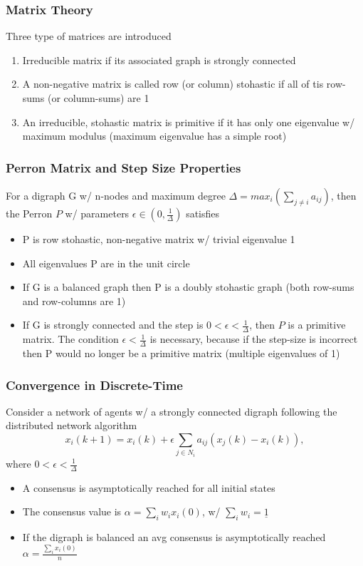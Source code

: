 \documentclass{beamer}
\begin{document}
\begin{frame}
\frametitle{Matrix Theory}
Three type of matrices are introduced
\begin{enumerate}
\item Irreducible  matrix if its associated graph is strongly connected \vspace{.2cm}
\item A non-negative matrix is called row (or column) stohastic if all of tis row-sums (or column-sums) are 1 \vspace{.2cm}
\item An irreducible, stohastic matrix is primitive if it has only one eigenvalue w/ maximum modulus (maximum eigenvalue has a simple root) 
\end{enumerate}
\end{frame}


\begin{frame}
\frametitle{Perron Matrix and Step Size Properties}
For a digraph G w/ n-nodes and maximum degree $\Delta = max_i(\sum_{j\neq i}a_{ij})$, then the Perron $P$ w/ parameters $\epsilon \in (0,\frac{1}{\Delta})$ satisfies
\begin{itemize}
\item P is row stohastic, non-negative matrix w/ trivial eigenvalue 1
\item All eigenvalues P are in the unit circle
\item If G is a balanced graph then P is a doubly stohastic graph (both row-sums and row-columns are 1)
\item If G is strongly connected and the step is $0< \epsilon <\frac{1}{\Delta}$, then $P$ is a primitive matrix. The condition $\epsilon <\frac{1}{\Delta}$ is necessary, because if the step-size is incorrect then P would no longer be a primitive matrix (multiple eigenvalues of 1)
\end{itemize}
\end{frame}


\begin{frame}
\frametitle{Convergence in Discrete-Time}
Consider a network of agents w/ a strongly connected digraph following the distributed network algorithm
\begin{equation*}
x_i(k+1)=x_i(k)+\epsilon \sum_{j\in N_i}a_{ij}(x_j(k)-x_i(k)),
\end{equation*}
where $0< \epsilon <\frac{1}{\Delta}$
\begin{itemize}
\item A consensus is asymptotically reached for all initial states
\item The consensus value is $\alpha = \sum_iw_ix_i(0)$, w/ $\sum_i w_i = \underline{1}$
\item If the digraph is balanced an avg consensus is asymptotically reached $\alpha=\frac{\sum_ix_i(0)}{n}$
\end{itemize}
\end{frame}
\end{document}
